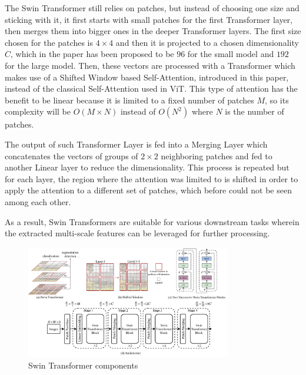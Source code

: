 The Swin Transformer still relies on patches, but instead of choosing one size
and sticking with it, it first starts with small patches for the first
Transformer layer, then merges them into bigger ones in the deeper Transformer
layers. The first size chosen for the patches is $4 \times 4$ and then it is
projected to a chosen dimensionality $C$, which in the paper has been proposed
to be $96$ for the small model and $192$ for the large model. Then, these
vectors are processed with a Transformer which makes use of a Shifted Window
based Self-Attention, introduced in this paper, instead of the classical
Self-Attention used in ViT. This type of attention has the benefit to be linear
because it is limited to a fixed number of patches $M$, so its complexity will
be $O(M \times N)$ instead of $O(N^2)$ where $N$ is the number of patches.

The output of such Transformer Layer is fed into a Merging Layer which
concatenates the vectors of groups of $2 \times 2$ neighboring patches and fed to
another Linear layer to reduce the dimensionality.
This process is repeated but for each layer, the region where the attention was
limited to is shifted in order to apply the attention to a different set of
patches, which before could not be seen among each other.

As a result, Swin Transformers are suitable for various downstream tasks wherein
the extracted multi-scale features can be leveraged for further processing.
\begin{figure}[ht!]
  \centering
  \includegraphics[width=0.8\textwidth]{Images/SwinTransformer.png}
  \caption{Swin Transformer components}
  \label{fig:swintransformer}
\end{figure}

